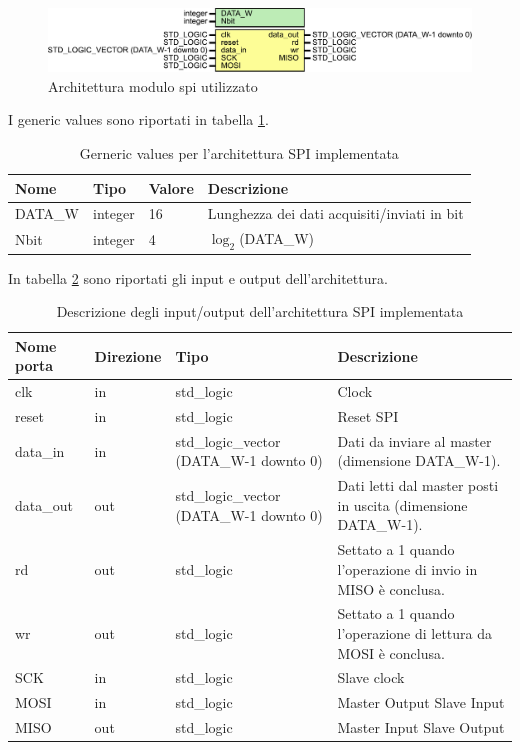 \documentclass[titlepage]{report}
\begin{document}
			\begin{figure}[ht]
				\centering
				\includegraphics[scale=0.6]{./img/spi_teros.pdf}
				\caption{Architettura modulo spi utilizzato}
				\label{fig:spi_module_teros}
			\end{figure}
			I generic values sono riportati in tabella \ref{tab:spi_generic}.
			\begin{table}[H]
				\begin{tabular}{|l|l|l|p{}|}
					\hline
					\textbf{Nome} & \textbf{Tipo} & \textbf{Valore} & \textbf{Descrizione} \\
					\hline
					DATA\_W & integer & 16 & Lunghezza dei dati acquisiti/inviati in bit \\
					Nbit & integer & 4 & $\log_2$(DATA\_W) \\
					\hline
				\end{tabular}
				\caption{Gerneric values per l'architettura SPI implementata}
				\label{tab:spi_generic}
			\end{table}

			In tabella \ref{tab:spi_IO} sono riportati gli input e output dell'architettura.

			\begin{table}[H]
				\centering
				\begin{tabular}{|l|l|p{}|p{}|}
				\hline
				\textbf{Nome porta} & \textbf{Direzione} & \textbf{Tipo} & \textbf{Descrizione} \\
				\hline
				clk & in & std\_logic & Clock \\
				reset & in & std\_logic & Reset SPI \\
				data\_in & in & std\_logic\_vector (DATA\_W-1 downto 0) & Dati da inviare al master (dimensione DATA\_W-1). \\
				data\_out & out & std\_logic\_vector (DATA\_W-1 downto 0) & Dati letti dal master posti in uscita (dimensione DATA\_W-1). \\
				rd & out & std\_logic & Settato a 1 quando l'operazione di invio in MISO è conclusa. \\
				wr & out & std\_logic & Settato a 1 quando l'operazione di lettura da MOSI è conclusa. \\
				SCK & in & std\_logic & Slave clock \\
				MOSI & in & std\_logic & Master Output Slave Input \\
				MISO & out & std\_logic & Master Input Slave Output \\
				\hline
				\end{tabular}
			\caption{Descrizione degli input/output dell'architettura SPI implementata}
			\label{tab:spi_IO}
			\end{table}
				
\end{document}
